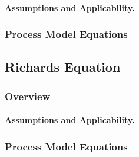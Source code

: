 \paragraph{Assumptions and Applicability.}

\subsubsection{Process Model Equations}


\subsection{Richards Equation}
\label{sec:richards-equation}

\subsubsection{Overview}
\label{sec:richards-overview}

\paragraph{Assumptions and Applicability.}
\label{sec:richards-assumptions}

\subsubsection{Process Model Equations} 
\label{sec:richards-model-equations}



